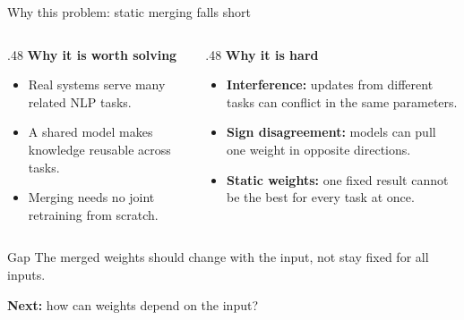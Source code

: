 \documentclass[aspectratio=169,10pt]{beamer}
\newcommand{\nextq}[1]{\vfill\raggedright{\small\color{hustmain}\textbf{Next:} #1}}
\begin{document}
\begin{frame}{Why this problem: static merging falls short}
  \begin{columns}[T]
    \begin{column}{.48\linewidth}
      \textbf{Why it is worth solving}
      \begin{itemize}
        \item Real systems serve many related NLP tasks.
        \item A shared model makes knowledge reusable across tasks.
        \item Merging needs no joint retraining from scratch.
      \end{itemize}
    \end{column}
    \begin{column}{.48\linewidth}
      \textbf{Why it is hard}
      \begin{itemize}
        \item \textbf{Interference:} updates from different tasks can conflict in the same parameters.
        \item \textbf{Sign disagreement:} models can pull one weight in opposite directions.
        \item \textbf{Static weights:} one fixed result cannot be the best for every task at once.
      \end{itemize}
    \end{column}
  \end{columns}
  \vfill
  \begin{block}{Gap}
    The merged weights should change with the input, not stay fixed for all inputs.
  \end{block}
  \nextq{how can weights depend on the input?}
\end{frame}
\end{document}
